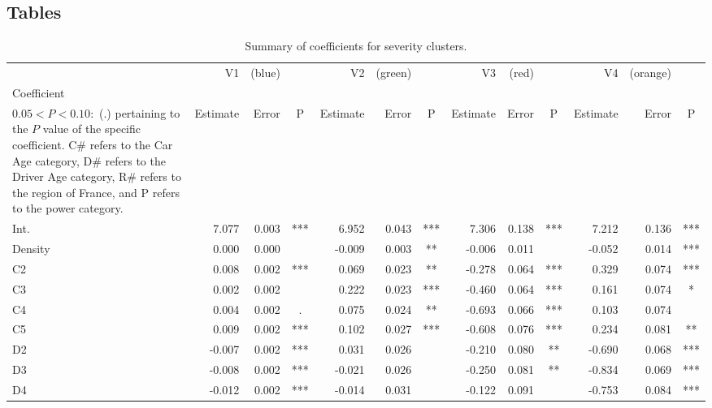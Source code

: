 \documentclass[12pt,letterpaper]{article}
\numberwithin{equation}{section}
\numberwithin{equation}{section}
\numberwithin{equation}{section}
\begin{document}
\begin{center}
\begin{table}

\section{Tables}\label{app:tables}

\caption{ Summary of coefficients for severity clusters.}
\label{severity_coef_table}
{\small\begin{tabular}{l|rrc|rrc|rrc|rrc}
\hline
         & V1         & (blue)     &    & V2         & (green)   &    & V3          & (red)     &    & V4          & (orange)     &    \\
Coefficient \footnote{The significance codes are defined as $  P < 0.001 : $  (***), $0.001 < P < 0.01:$ (**), $  0.01 < P < 0.05:$ (*),\\ $0.05 < P < 0.10 : $ (.) %
pertaining to the $P$ value of the specific coefficient. C\# refers to the Car Age category, D\# refers to the Driver Age category, R\# refers to the region of France, and P refers to the power category.  }      & Estimate   & Error     & P   & Estimate   & Error     & P   & Estimate    & Error      & P   & Estimate    & Error      & P   \\ \hline
Int. & 7.077 & 0.003 & *** & 6.952 & 0.043 & *** & 7.306 & 0.138 & *** & 7.212 & 0.136 & *** \\
Density & 0.000 & 0.000 &  & -0.009 & 0.003 & ** & -0.006 & 0.011 &  & -0.052 & 0.014 & *** \\
C2 & 0.008 & 0.002 & *** & 0.069 & 0.023 & ** & -0.278 & 0.064 & *** & 0.329 & 0.074 & *** \\
C3 & 0.002 & 0.002 &  & 0.222 & 0.023 & *** & -0.460 & 0.064 & *** & 0.161 & 0.074 & * \\
C4 & 0.004 & 0.002 & . & 0.075 & 0.024 & ** & -0.693 & 0.066 & *** & 0.103 & 0.074 &  \\
C5 & 0.009 & 0.002 & *** & 0.102 & 0.027 & *** & -0.608 & 0.076 & *** & 0.234 & 0.081 & ** \\
D2 & -0.007 & 0.002 & *** & 0.031 & 0.026 &  & -0.210 & 0.080 & ** & -0.690 & 0.068 & *** \\
D3 & -0.008 & 0.002 & *** & -0.021 & 0.026 &  & -0.250 & 0.081 & ** & -0.834 & 0.069 & *** \\
D4 & -0.012 & 0.002 & *** & -0.014 & 0.031 &  & -0.122 & 0.091 &  & -0.753 & 0.084 & *** \\

\end{tabular}}
\end{table}
\end{center}
\end{document}
